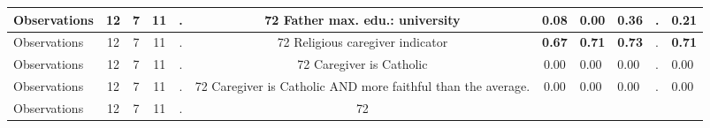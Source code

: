 \begin{tabular}{l c c c c c c }
\midrule
Observations &        12 &         7 &        11 & . &        72
Father max. edu.: university &      0.08 &      0.00 & \textbf{     0.36} &         . & \textbf{     0.21} \\
\midrule
Observations &        12 &         7 &        11 & . &        72
Religious caregiver indicator & \textbf{     0.67} & \textbf{     0.71} & \textbf{     0.73} &         . & \textbf{     0.71} \\
\midrule
Observations &        12 &         7 &        11 & . &        72
Caregiver is Catholic &      0.00 &      0.00 &      0.00 &         . &      0.00 \\
\midrule
Observations &        12 &         7 &        11 & . &        72
Caregiver is Catholic AND more faithful than the average. &      0.00 &      0.00 &      0.00 &         . &      0.00 \\
\midrule
Observations &        12 &         7 &        11 & . &        72
\bottomrule
\end{tabular}
